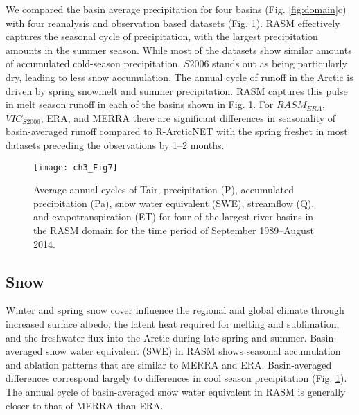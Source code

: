 We compared the basin average precipitation for four basins (Fig. \ref{fig:domain}c) with four reanalysis and observation based datasets (Fig. \ref{fig:water_cycle}).
RASM effectively captures the seasonal cycle of precipitation, with the largest precipitation amounts in the summer season.
While most of the datasets show similar amounts of accumulated cold-season precipitation, $S2006$ stands out as being particularly dry, leading to less snow accumulation.
The annual cycle of runoff in the Arctic is driven by spring snowmelt and summer precipitation.
RASM captures this pulse in melt season runoff in each of the basins shown in Fig. \ref{fig:water_cycle}.
For $RASM_{ERA}$, $VIC_{S2006}$, ERA, and MERRA there are significant differences in seasonality of basin-averaged runoff compared to R-ArcticNET with the spring freshet in most datasets preceding the observations by 1–2 months.

\begin{figure}
  \centering
  \texttt{[image: ch3\_Fig7]}
  \caption{Average annual cycles of Tair, precipitation (P), accumulated precipitation (Pa), snow water equivalent (SWE), streamflow (Q), and evapotranspiration (ET) for four of the largest river basins in the RASM domain for the time period of September 1989–August 2014.}
  \label{fig:water_cycle}
\end{figure}

\subsection{Snow}

Winter and spring snow cover influence the regional and global climate through increased surface albedo, the latent heat required for melting and sublimation, and the freshwater flux into the Arctic during late spring and summer.
Basin-averaged snow water equivalent (SWE) in RASM shows seasonal accumulation and ablation patterns that are similar to MERRA and ERA.
Basin-averaged differences correspond largely to differences in cool season precipitation (Fig. \ref{fig:water_cycle}).
The annual cycle of basin-averaged snow water equivalent in RASM is generally closer to that of MERRA than ERA.

